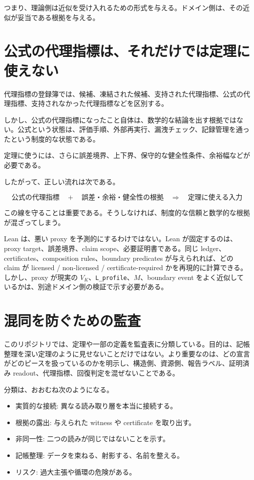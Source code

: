 \documentclass[12pt,a4paper]{article}
\begin{document}
つまり、理論側は近似を受け入れるための形式を与える。ドメイン側は、その近似が妥当である根拠を与える。

\section{公式の代理指標は、それだけでは定理に使えない}\label{ux516cux5f0fux306eux4ee3ux7406ux6307ux6a19ux306fux305dux308cux3060ux3051ux3067ux306fux5b9aux7406ux306bux4f7fux3048ux306aux3044}

代理指標の登録簿では、候補、凍結された候補、支持された代理指標、公式の代理指標、支持されなかった代理指標などを区別する。

しかし、公式の代理指標になったこと自体は、数学的な結論を出す根拠ではない。公式という状態は、評価手順、外部再実行、漏洩チェック、記録管理を通ったという制度的な状態である。

定理に使うには、さらに誤差境界、上下界、保守的な健全性条件、余裕幅などが必要である。

したがって、正しい流れは次である。

\[
\text{公式の代理指標}
\quad+\quad
\text{誤差・余裕・健全性の根拠}
\quad\Longrightarrow\quad
\text{定理に使える入力}
\]

この線を守ることは重要である。そうしなければ、制度的な信頼と数学的な根拠が混ざってしまう。

Lean は、悪い proxy を予測的にするわけではない。Lean が固定するのは、proxy target、誤差境界、claim scope、必要証明書である。同じ ledger、certificates、composition rules、boundary predicates が与えられれば、どの claim が licensed / non-licensed / certificate-required かを再現的に計算できる。しかし、proxy が現実の \(V_K\)、\texttt{L\_profile}、\(M\)、boundary event をよく近似しているかは、別途ドメイン側の検証で示す必要がある。

\section{混同を防ぐための監査}\label{ux6df7ux540cux3092ux9632ux3050ux305fux3081ux306eux76e3ux67fb}

このリポジトリでは、定理や一部の定義を監査表に分類している。目的は、記帳整理を深い定理のように見せないことだけではない。より重要なのは、どの宣言がどのピースを扱っているのかを明示し、構造側、資源側、報告ラベル、証明済み readout、代理指標、回復判定を混ぜないことである。

分類は、おおむね次のようになる。

\begin{itemize}
\tightlist
\item
  実質的な接続: 異なる読み取り層を本当に接続する。
\item
  根拠の露出: 与えられた witness や certificate を取り出す。
\item
  非同一性: 二つの読みが同じではないことを示す。
\item
  記帳整理: データを束ねる、射影する、名前を整える。
\item
  リスク: 過大主張や循環の危険がある。
\end{itemize}
\end{document}
